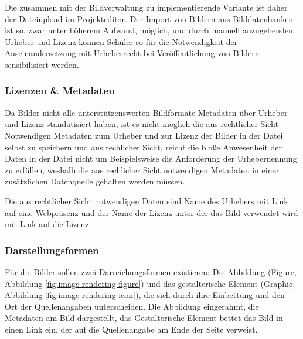 Die zusammen mit der Bildverwaltung zu implementierende Variante ist daher der
Dateiupload im Projekteditor. Der Import von Bildern aus Bilddatenbanken ist so,
zwar unter höherem Aufwand, möglich, und durch manuell anzugebenden Urheber und
Lizenz können Schüler so für die Notwendigkeit der Auseinandersetzung mit
Urheberrecht bei Veröffentlichung von Bildern sensibilisiert werden.

\subsubsection{Lizenzen \& Metadaten}

Da Bilder nicht alle unterstützenswerten Bildformate Metadaten über
Urheber und Lizenz standatisiert haben, ist es nicht möglich die aus
rechtlicher Sicht Notwendigen Metadaten zum Urheber und zur Lizenz der Bilder
in der Datei selbst zu speichern und aus rechlicher Sicht, reicht die bloße
Anwesenheit der Daten in der Datei nicht um Beispielsweise die Anforderung der
Urhebernennung zu erfüllen, weshalb die aus rechlicher Sicht notwendigen
Metadaten in einer zusätzlichen Datenquelle gehalten werden müssen. \cite{JPEG-Spec}
\cite{GIF-Spec} \cite{PNG-Spec} \cite{SVG-Spec}

Die aus rechtlicher Sicht notwendigen Daten sind Name des Urhebers mit Link auf
eine Webpräsenz und der Name der Lizenz unter der das Bild verwendet wird
mit Link auf die Lizenz.

\subsubsection{Darstellungsformen}

Für die Bilder sollen zwei Darreichungsformen existieren: Die Abbildung
(Figure, Abbildung \ref{fig:image-rendering-figure}) und das gestalterische
Element (Graphic, Abbildung \ref{fig:image-rendering-icon}), die sich durch ihre
Einbettung und den Ort der Quellenangaben unterscheiden. Die Abbildung
eingerahmt, die Metadaten am Bild dargestellt, das Gestalterische Element bettet
das Bild in einen Link ein, der auf die Quellenangabe am Ende der Seite
verweist.

